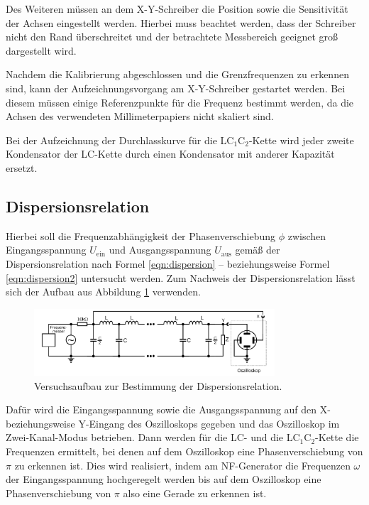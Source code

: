 Des Weiteren müssen an dem X-Y-Schreiber die Position sowie die Sensitivität der Achsen eingestellt werden.
Hierbei muss beachtet werden, dass der Schreiber nicht den Rand überschreitet und der betrachtete Messbereich geeignet groß dargestellt wird.

Nachdem die Kalibrierung abgeschlossen und die Grenzfrequenzen zu erkennen sind, kann der Aufzeichnungsvorgang am X-Y-Schreiber gestartet werden.
Bei diesem müssen einige Referenzpunkte für die Frequenz bestimmt werden,
da die Achsen des verwendeten Millimeterpapiers nicht skaliert sind.

Bei der Aufzeichnung der Durchlasskurve für die LC$_1$C$_2$-Kette wird jeder zweite Kondensator der LC-Kette durch einen Kondensator mit anderer Kapazität ersetzt.


\subsection{Dispersionsrelation}
\label{sec:dispi}

Hierbei soll die Frequenzabhängigkeit der Phasenverschiebung $\phi$
zwischen Eingangsspannung $U_{\text{ein}}$ und Ausgangsspannung $U_{\text{aus}}$ gemäß der Dispersionsrelation nach Formel \eqref{eqn:dispersion}
-- beziehungsweise Formel \eqref{eqn:dispersion2} untersucht werden.
Zum Nachweis der Dispersionsrelation lässt sich der Aufbau aus Abbildung
\ref{fig:dispersionsrealtion} verwenden.
\begin{figure}
	\centering
	\includegraphics[width=0.8\textwidth]{Bilder/dispersionsrelation.png}
	\caption{Versuchsaufbau zur Bestimmung der Dispersionsrelation. \cite{Anleitung}}
	\label{fig:dispersionsrealtion}
\end{figure}
Dafür wird die Eingangsspannung sowie die Ausgangsspannung auf den X- beziehungsweise Y-Eingang
des Oszilloskops gegeben und das Oszilloskop im Zwei-Kanal-Modus betrieben.
Dann werden für die LC- und die LC$_1$C$_2$-Kette die Frequenzen ermittelt, bei denen auf
dem Oszilloskop eine Phasenverschiebung von $\pi$ zu erkennen ist.
Dies wird realisiert, indem am NF-Generator die Frequenzen $\omega$ der Eingangsspannung
hochgeregelt werden bis auf dem Oszilloskop eine Phasenverschiebung von $\pi$ also eine
Gerade zu erkennen ist.


